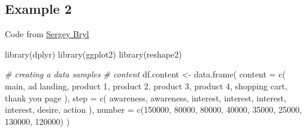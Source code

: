 \documentclass[
]{book}
\newenvironment{Shaded}{\begin{snugshade}}{\end{snugshade}}
\newcommand{\AttributeTok}[1]{\textcolor[rgb]{0.77,0.63,0.00}{#1}}
\newcommand{\CommentTok}[1]{\textcolor[rgb]{0.56,0.35,0.01}{\textit{#1}}}
\newcommand{\DecValTok}[1]{\textcolor[rgb]{0.00,0.00,0.81}{#1}}
\newcommand{\FunctionTok}[1]{\textcolor[rgb]{0.00,0.00,0.00}{#1}}
\newcommand{\NormalTok}[1]{#1}
\newcommand{\OtherTok}[1]{\textcolor[rgb]{0.56,0.35,0.01}{#1}}
\newcommand{\StringTok}[1]{\textcolor[rgb]{0.31,0.60,0.02}{#1}}
\begin{document}
\hypertarget{example-2-1}{%
\subsection{Example 2}\label{example-2-1}}

Code from \href{https://www.analyzecore.com/2015/06/23/sales-funnel-visualization-with-r/}{Sergey Bryl}

\begin{Shaded}
\begin{Highlighting}[]
\FunctionTok{library}\NormalTok{(dplyr)}
\FunctionTok{library}\NormalTok{(ggplot2)}
\FunctionTok{library}\NormalTok{(reshape2)}

\CommentTok{\# creating a data samples}
\CommentTok{\# content}
\NormalTok{df.content }\OtherTok{\textless{}{-}} \FunctionTok{data.frame}\NormalTok{(}
    \AttributeTok{content =} \FunctionTok{c}\NormalTok{(}
        \StringTok{\textquotesingle{}main\textquotesingle{}}\NormalTok{,}
        \StringTok{\textquotesingle{}ad landing\textquotesingle{}}\NormalTok{,}
        \StringTok{\textquotesingle{}product 1\textquotesingle{}}\NormalTok{,}
        \StringTok{\textquotesingle{}product 2\textquotesingle{}}\NormalTok{,}
        \StringTok{\textquotesingle{}product 3\textquotesingle{}}\NormalTok{,}
        \StringTok{\textquotesingle{}product 4\textquotesingle{}}\NormalTok{,}
        \StringTok{\textquotesingle{}shopping cart\textquotesingle{}}\NormalTok{,}
        \StringTok{\textquotesingle{}thank you page\textquotesingle{}}
\NormalTok{    ),}
    \AttributeTok{step =} \FunctionTok{c}\NormalTok{(}
        \StringTok{\textquotesingle{}awareness\textquotesingle{}}\NormalTok{,}
        \StringTok{\textquotesingle{}awareness\textquotesingle{}}\NormalTok{,}
        \StringTok{\textquotesingle{}interest\textquotesingle{}}\NormalTok{,}
        \StringTok{\textquotesingle{}interest\textquotesingle{}}\NormalTok{,}
        \StringTok{\textquotesingle{}interest\textquotesingle{}}\NormalTok{,}
        \StringTok{\textquotesingle{}interest\textquotesingle{}}\NormalTok{,}
        \StringTok{\textquotesingle{}desire\textquotesingle{}}\NormalTok{,}
        \StringTok{\textquotesingle{}action\textquotesingle{}}
\NormalTok{    ),}
    \AttributeTok{number =} \FunctionTok{c}\NormalTok{(}\DecValTok{150000}\NormalTok{, }\DecValTok{80000}\NormalTok{,}
               \DecValTok{80000}\NormalTok{, }\DecValTok{40000}\NormalTok{, }\DecValTok{35000}\NormalTok{, }\DecValTok{25000}\NormalTok{,}
               \DecValTok{130000}\NormalTok{,}
               \DecValTok{120000}\NormalTok{)}
\NormalTok{)}

\end{Highlighting}
\end{Shaded}
\end{document}
